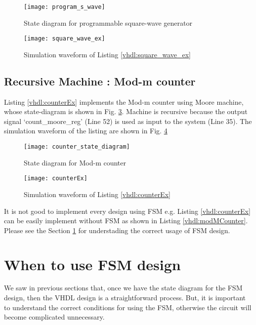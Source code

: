 \begin{figure}[!h]
	\centering
	\texttt{[image: program\_s\_wave]}
	\caption{State diagram for programmable square-wave generator}
	\label{fig:program_s_wave}
\end{figure}

\begin{figure}[!h]
	\centering
	\texttt{[image: square\_wave\_ex]}
	\caption{Simulation waveform of Listing \ref{vhdl:square_wave_ex}}
	\label{fig:square_wave_ex}
\end{figure}



\subsection{Recursive Machine : Mod-m counter}
Listing \ref{vhdl:counterEx} implements the Mod-m counter using Moore machine, whose state-diagram is shown in Fig. \ref{fig:counter_state_diagram}. Machine is recursive because the output signal `count\_moore\_reg' (Line 52) is used as input to the system (Line 35). The simulation waveform of the listing are shown in Fig. \ref{fig:counterEx}

\begin{figure}[!h]
	\centering
	\texttt{[image: counter\_state\_diagram]}
	\caption{State diagram for Mod-m counter}
	\label{fig:counter_state_diagram}
\end{figure}

\begin{figure}[!h]
	\centering
	\texttt{[image: counterEx]}
	\caption{Simulation waveform of Listing \ref{vhdl:counterEx}}
	\label{fig:counterEx}
\end{figure}

\begin{noNumBox}
It is not good to implement every design using FSM e.g. Listing \ref{vhdl:counterEx} can be easily implement without FSM as shown in Listing \ref{vhdl:modMCounter}. Please see the Section \ref{sec:whentouseFsm} for understading the correct usage of FSM design. 
\end{noNumBox}
	



\section{When to use FSM design}\label{sec:whentouseFsm}
We saw in previous sections that, once we have the state diagram for the FSM design, then the VHDL design is a straightforward process. But, it is important to understand the correct conditions for using the FSM, otherwise the circuit will become complicated unnecessary. 

